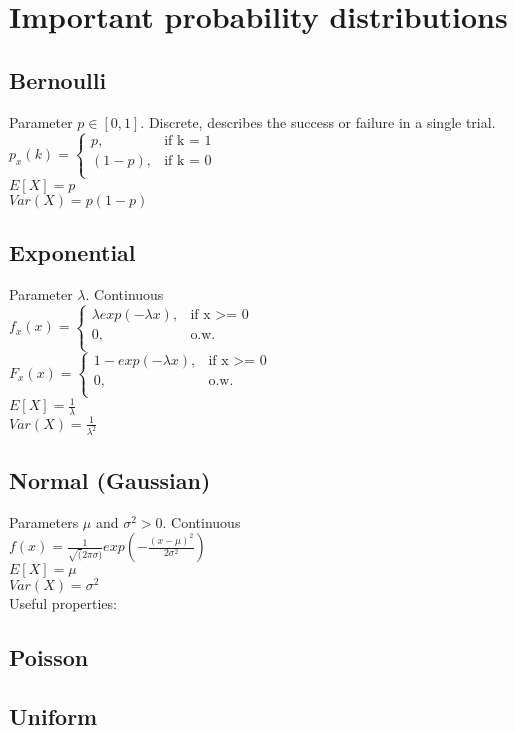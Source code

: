 \section{Important probability distributions}
\subsection*{Bernoulli}
Parameter $p \in[0,1]$. Discrete, describes the success or failure in a single trial.\\
$ p_x(k)=
	\begin{cases}
		 p,&\text{if k = 1}\\
		(1-p),&\text{if k = 0}\\
	\end{cases}
$\\
$E[X]=p$\\
$Var(X)=p(1-p)$
\subsection*{Exponential}
Parameter $\lambda$. Continuous\\
$ f_x(x)=
	\begin{cases}
		 \lambda exp(-\lambda x),&\text{if x >= 0}\\
		0,&\text{o.w.}\\
	\end{cases}
$\\
$ F_x(x)=
	\begin{cases}
		 1-exp(-\lambda x),&\text{if x >= 0}\\
		0,&\text{o.w.}\\
	\end{cases}
$\\
$E[X]=\frac{1}{\lambda}$\\
$Var(X)=\frac{1}{\lambda^2}$

\subsection*{Normal (Gaussian)}
Parameters $\mu$ and $\sigma^2 >0$. Continuous\\
$f(x)= \frac{1}{\sqrt(2 \pi \sigma)} exp(-\frac{(x-\mu)^2}{2\sigma^2})$ \\
$E[X]=\mu$ \\
$Var(X)=\sigma^2$\\
Useful properties:\\


\subsection*{Poisson}
\subsection*{Uniform}

